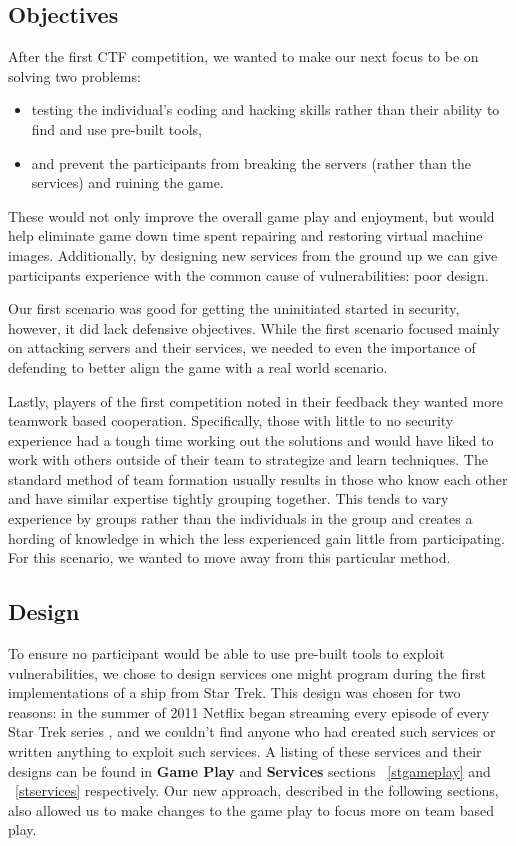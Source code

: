 \documentclass[10pt]{article}
\begin{document}
\subsection{Objectives}
After the first CTF competition, we wanted to make our next focus to be on
solving two problems:
\begin{itemize}
	\item testing the individual's coding and hacking skills rather than their
	ability to find and use pre-built tools,
	\item and prevent the participants from breaking the servers (rather than the
	services) and ruining the game.
\end{itemize}

These would not only improve the overall game play and enjoyment, but would
help eliminate game down time spent repairing and restoring virtual machine
images. Additionally, by designing new services from the ground up we can
give participants experience with the common cause of vulnerabilities: poor
design.

Our first scenario was good for getting the uninitiated started in security,
however, it did lack defensive objectives. While the first scenario focused
mainly on attacking servers and their services, we needed to even the importance
of defending to better align the game with a real world scenario.

Lastly, players of the first competition noted in their feedback they wanted
more teamwork based cooperation. Specifically, those with little to no security
experience had a tough time working out the solutions and would have liked to
work with others outside of their team to strategize and learn techniques. The
standard method of team formation usually results in those who know each other
and have similar expertise tightly grouping together. This tends to vary
experience by groups rather than the individuals in the group and creates a
hording of knowledge in which the less experienced gain little from
participating. For this scenario, we wanted to move away from this particular
method.

\subsection{Design}
\label{stdesign}
To ensure no participant would be able to use pre-built tools to exploit
vulnerabilities, we chose to design services one might program during the first
implementations of a ship from Star Trek. This design was chosen
for two reasons: in the summer of 2011 Netflix began streaming every episode of
every Star Trek series \cite{Netflix}, and we couldn't find anyone who
had created such services or written anything to exploit such services. A
listing of these services and their designs can be found in \textbf{Game Play}
and \textbf{Services} sections ~\ref{stgameplay} and ~\ref{stservices}
respectively. Our new approach, described in the following sections, also
allowed us to make changes to the game play to focus more on team based play.
\end{document}

